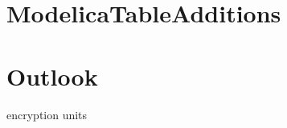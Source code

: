 \documentclass{modelica}
\begin{document}
\cite{modelisax2018hints}

\section{ModelicaTableAdditions}

\section{Outlook}
encryption
units






\end{document}
